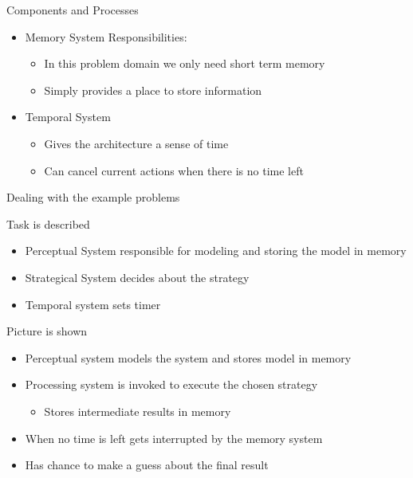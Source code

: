 \documentclass[presentation]{beamer}
\begin{document}
\begin{frame}[label=sec-3]{Components and Processes}
\begin{itemize}
\item Memory System
Responsibilities:
\begin{itemize}
\item In this problem domain we only need short term memory
\item Simply provides a place to store information
\end{itemize}
\end{itemize}
\begin{itemize}
\item Temporal System
\begin{itemize}
\item Gives the architecture a sense of time
\item Can cancel current actions when there is no time left
\end{itemize}
\end{itemize}
\end{frame}



\begin{frame}[label=sec-4]{Dealing with the example problems}
\begin{block}{Task is described}
\begin{itemize}
\item Perceptual System responsible for modeling and storing the model in memory
\item Strategical System decides about the strategy
\item Temporal system sets timer
\end{itemize}
\end{block}
\begin{block}{Picture is shown}
\begin{itemize}
\item Perceptual system models the system and stores model in memory
\item Processing system is invoked to execute the chosen strategy
\begin{itemize}
\item Stores intermediate results in memory
\end{itemize}
\item When no time is left gets interrupted by the memory system
\item Has chance to make a guess about the final result
\end{itemize}
\end{block}
\end{frame}
\end{document}
